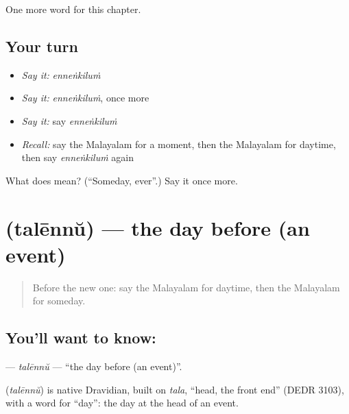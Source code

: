 \begin{grammarlens}[title={What you've built}]
One more word for this chapter.
\end{grammarlens}

\subsection*{Your turn}
\begin{itemize}
\raggedright
  \item \emph{Say it:} \emph{enneṅkiluṁ}
  \item \emph{Say it:} \emph{enneṅkiluṁ}, once more
  \item \emph{Say it:} say \emph{enneṅkiluṁ}
  \item \emph{Recall:} say the Malayalam for a moment, then the Malayalam for daytime, then say \emph{enneṅkiluṁ} again
\end{itemize}

\begin{tcolorbox}[breakable,colback=teal!4,colframe=teal!35!black,title={Before you move on}]
What does  mean? (\textquotedblleft{}Someday, ever\textquotedblright{}.) Say it once more.
\end{tcolorbox}
\section[\texorpdfstring{\ml{തലേന്ന്} (talēnnŭ)}{തലേന്ന് (talēnnŭ)}]{ (talēnnŭ) — the day before (an event)}

\label{lesson:ML-C237-talennu}



\begin{quote}
Before the new one: say the Malayalam for daytime, then the Malayalam for someday.
\end{quote}

\subsection*{You'll want to know: }
\textbf{} — \emph{talēnnŭ} — \textquotedblleft{}the day before (an event)\textquotedblright{}.

\begin{cousinweb}
\textbf{} (\emph{talēnnŭ}) is native Dravidian, built on \emph{tala}, \textquotedblleft{}head, the front end\textquotedblright{} (DEDR 3103), with a word for \textquotedblleft{}day\textquotedblright{}: the day at the head of an event.
\end{cousinweb}

